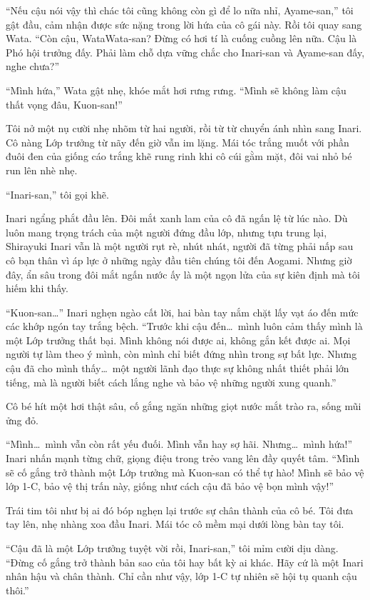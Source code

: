 \documentclass[../main.tex]{subfiles}
\begin{document}
``Nếu cậu nói vậy thì chác tôi cũng không còn gì để lo nữa nhỉ, Ayame-san,'' tôi gật đầu, cảm nhận được sức nặng trong lời hứa của cô gái này. Rồi tôi quay sang Wata. ``Còn cậu, WataWata-san? Đừng có hơi tí là cuống cuồng lên nữa. Cậu là Phó hội trưởng đấy. Phải làm chỗ dựa vững chắc cho Inari-san và Ayame-san đấy, nghe chưa?''

``Mình hứa,'' Wata gật nhẹ, khóe mắt hơi rưng rưng. ``Mình sẽ không làm cậu thất vọng đâu, Kuon-san!''

Tôi nở một nụ cười nhẹ nhõm từ hai người, rồi từ từ chuyển ánh nhìn sang Inari. Cô nàng Lớp trưởng từ nãy đến giờ vẫn im lặng. Mái tóc trắng muốt với phần đuôi đen của giống cáo trắng khẽ rung rinh khi cô cúi gằm mặt, đôi vai nhỏ bé run lên nhè nhẹ.

``Inari-san,'' tôi gọi khẽ.

Inari ngẩng phắt đầu lên. Đôi mắt xanh lam của cô đã ngấn lệ từ lúc nào. Dù luôn mang trọng trách của một người đứng đầu lớp, nhưng tựu trung lại, Shirayuki Inari vẫn là một người rụt rè, nhút nhát, người đã từng phải nấp sau cô bạn thân vì áp lực ở những ngày đầu tiên chúng tôi đến Aogami. Nhưng giờ đây, ẩn sâu trong đôi mắt ngấn nước ấy là một ngọn lửa của sự kiên định mà tôi hiếm khi thấy.

``Kuon-san\dots'' Inari nghẹn ngào cất lời, hai bàn tay nắm chặt lấy vạt áo đến mức các khớp ngón tay trắng bệch. ``Trước khi cậu đến\dots\ mình luôn cảm thấy mình là một Lớp trưởng thất bại. Mình không nói được ai, không gắn kết được ai. Mọi người tự làm theo ý mình, còn mình chỉ biết đứng nhìn trong sự bất lực. Nhưng cậu đã cho mình thấy\dots\ một người lãnh đạo thực sự không nhất thiết phải lớn tiếng, mà là người biết cách lắng nghe và bảo vệ những người xung quanh.''

Cô bé hít một hơi thật sâu, cố gắng ngăn những giọt nước mắt trào ra, sống mũi ửng đỏ.

``Mình\dots\ mình vẫn còn rất yếu đuối. Mình vẫn hay sợ hãi. Nhưng\dots\ mình hứa!'' Inari nhấn mạnh từng chữ, giọng điệu trong trẻo vang lên đầy quyết tâm. ``Mình sẽ cố gắng trở thành một Lớp trưởng mà Kuon-san có thể tự hào! Mình sẽ bảo vệ lớp 1-C, bảo vệ thị trấn này, giống như cách cậu đã bảo vệ bọn mình vậy!''

Trái tim tôi như bị ai đó bóp nghẹn lại trước sự chân thành của cô bé. Tôi đưa tay lên, nhẹ nhàng xoa đầu Inari. Mái tóc cô mềm mại dưới lòng bàn tay tôi.

``Cậu đã là một Lớp trưởng tuyệt vời rồi, Inari-san,'' tôi mỉm cười dịu dàng. ``Đừng cố gắng trở thành bản sao của tôi hay bất kỳ ai khác. Hãy cứ là một Inari nhân hậu và chân thành. Chỉ cần như vậy, lớp 1-C tự nhiên sẽ hội tụ quanh cậu thôi.''
\end{document}
